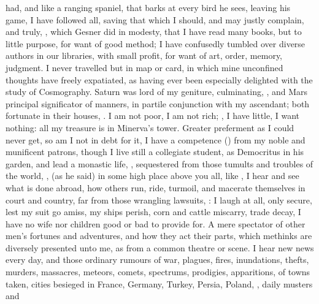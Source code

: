 {had, and like a ranging spaniel, that barks at every bird he sees,
leaving his game, I have followed all, saving that which I should, and
may justly complain, and truly, , which
Gesner did in modesty, that I have read many books, but to little
purpose, for want of good method; I have confusedly tumbled over diverse
authors in our libraries, with small profit, for want of art, order,
memory, judgment. I never travelled but in map or card, in which mine
unconfined thoughts have freely expatiated, as having ever been
especially delighted with the study of Cosmography. Saturn was lord
of my geniture, culminating, \etc, and Mars principal significator of
manners, in partile conjunction with my ascendant; both fortunate in
their houses, \etc. I am not poor, I am not rich; ,
I have little, I want nothing: all my treasure is in Minerva's tower.
Greater preferment as I could never get, so am I not in debt for it, I
have a competence () from my noble and munificent patrons,
though I live still a collegiate student, as Democritus in his garden,
and lead a monastic life, , sequestered from those
tumults and troubles of the world, ,
(as he said) in some high place above you all, like , I hear and see what is done abroad, how others run, ride,
turmoil, and macerate themselves in court and country, far from those
wrangling lawsuits, : I laugh at all, only secure, lest my suit go amiss, my ships
perish, corn and cattle miscarry, trade decay, I have no wife nor
children good or bad to provide for. A mere spectator of other men's
fortunes and adventures, and how they act their parts, which methinks
are diversely presented unto me, as from a common theatre or scene. I
hear new news every day, and those ordinary rumours of war, plagues,
fires, inundations, thefts, murders, massacres, meteors, comets,
spectrums, prodigies, apparitions, of towns taken, cities besieged in
France, Germany, Turkey, Persia, Poland, \etc, daily musters and
}
